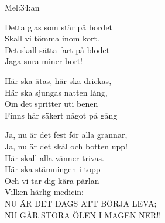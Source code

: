 \begin{SongText}
    \begin{SongInfo}
        Mel:34:an
    \end{SongInfo}
    \begin{SongVerse}
        Detta glas som står på bordet\\%
        Skall vi tömma inom kort.\\%
        Det skall sätta fart på blodet\\%
        Jaga sura miner bort!
    \end{SongVerse}
    \begin{SongVerse}
        Här ska ätas, här ska drickas,\\%
        Här ska sjungas natten lång,\\%
        Om det spritter uti benen\\%
        Finns här säkert något på gång
    \end{SongVerse}
    \begin{SongVerse}
        Ja, nu är det fest för alla grannar,\\%
        Ja, nu är det skål och botten upp!\\%
        Här skall alla vänner trivas.\\%
        Här ska stämningen i topp\\%
        Och vi tar dig kära pärlan\\%
        Vilken härlig medicin:\\%
        NU ÄR DET DAGS ATT BÖRJA LEVA;\\%
        NU GÅR STORA ÖLEN I MAGEN NER!!
    \end{SongVerse}
\end{SongText}
